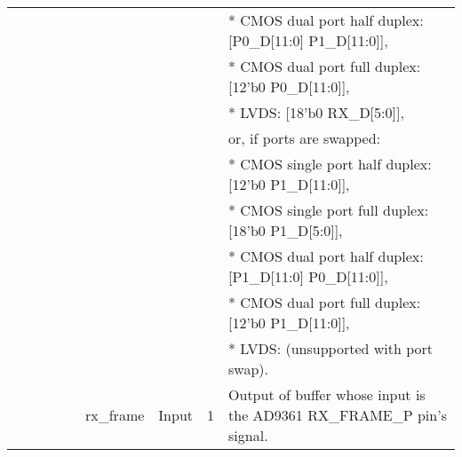 \documentclass{article}
\begin{document}
\begin{landscape}
\begin{scriptsize}
\begin{tabular}{|p{1.75cm}|p{2.25cm}|p{1cm}|p{1cm}|p{1.25cm}|p{3cm}|p{1.4cm}|p{0.9cm}|p{7cm}|}
			                           &                                 &       &          &                       &                       &                            &                          & * CMOS dual port half duplex: [P0\_D[11:0] P1\_D[11:0]], \\
			                           &                                 &       &          &                       &                       &                            &                          & * CMOS dual port full duplex: [12'b0 P0\_D[11:0]], \\
			                           &                                 &       &          &                       &                       &                            &                          & * LVDS: [18'b0 RX\_D[5:0]], \\
			                           &                                 &       &          &                       &                       &                            &                          & or, if ports are swapped: \\
			                           &                                 &       &          &                       &                       &                            &                          & * CMOS single port half duplex: [12'b0 P1\_D[11:0]], \\
			                           &                                 &       &          &                       &                       &                            &                          & * CMOS single port full duplex: [18'b0 P1\_D[5:0]], \\
			                           &                                 &       &          &                       &                       &                            &                          & * CMOS dual port half duplex: [P1\_D[11:0] P0\_D[11:0]], \\
			                           &                                 &       &          &                       &                       &                            &                          & * CMOS dual port full duplex: [12'b0 P1\_D[11:0]], \\
			                           &                                 &       &          &                       &                       &                            &                          & * LVDS: (unsupported with port swap). \\
			\cline{6-9}
			&  &  &     &      &rx\_frame &Input &   1   & Output of buffer whose input is the AD9361 RX\_FRAME\_P pin's signal. \\

\end{tabular}
\end{scriptsize}
\end{landscape}
\end{document}
